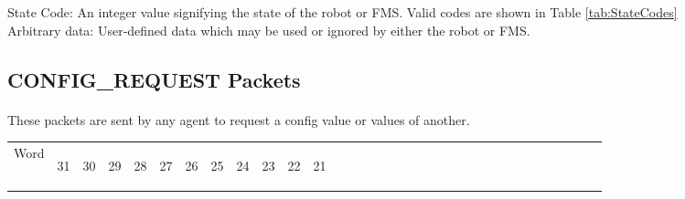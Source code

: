 \documentclass[11pt]{article}
\begin{document}
State Code: An integer value signifying the state of the robot or FMS.  Valid codes are shown in Table \ref{tab:StateCodes}\\
Arbitrary data: User-defined data which may be used or ignored by either the robot or FMS.

\subsection {CONFIG\_REQUEST Packets}
\paragraph{}
These packets are sent by any agent to request a config value or values of another.
\newline
\begin{table}[h]
    \centering
    \label{tab:configRequestDef}
    \begin{tabular}{|p{1cm}|m{0.04cm}|m{0.04cm}|m{0.04cm}|m{0.04cm}|m{0.04cm}|m{0.04cm}|m{0.04cm}|m{0.04cm}|m{0.04cm}|
        m{0.04cm}|m{0.04cm}|m{0.04cm}|m{0.04cm}|m{0.04cm}|m{0.04cm}|m{0.04cm}|m{0.04cm}|m{0.04cm}|m{0.04cm}|m{0.04cm}|
        m{0.04cm}|m{0.04cm}|m{0.04cm}|m{0.04cm}|m{0.04cm}|m{0.04cm}|m{0.04cm}|m{0.04cm}|m{0.04cm}|m{0.04cm}|m{0.04cm}|m{0.04cm}|}
        \hline
        Word & 
        \begin{sideways}31\end{sideways} &
        \begin{sideways}30\end{sideways} & 
        \begin{sideways}29\end{sideways} &
        \begin{sideways}28\end{sideways} &
        \begin{sideways}27\end{sideways} &
        \begin{sideways}26\end{sideways} &
        \begin{sideways}25\end{sideways} &
        \begin{sideways}24\end{sideways} &
        \begin{sideways}23\end{sideways} &
        \begin{sideways}22\end{sideways} &
        \begin{sideways}21\end{sideways} &

\end{tabular}
\end{table}
\end{document}
